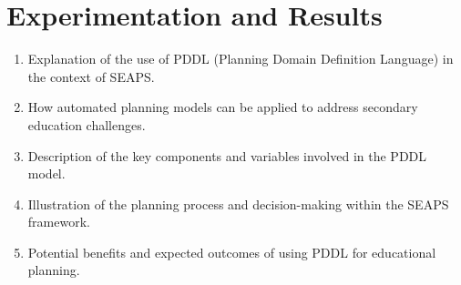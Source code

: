 \section{Experimentation and Results}
\begin{enumerate}
    \item Explanation of the use of PDDL (Planning Domain Definition Language) in the context of SEAPS\@.
    \item How automated planning models can be applied to address secondary education challenges.
    \item Description of the key components and variables involved in the PDDL model.
    \item Illustration of the planning process and decision-making within the SEAPS framework.
    \item Potential benefits and expected outcomes of using PDDL for educational planning.
\end{enumerate}